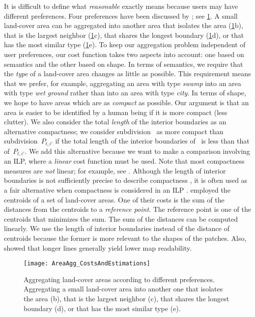 It is difficult to define what \emph{reasonable} exactly means 
because users may have different preferences.
Four preferences have been discussed by
\textcite{Cheng2006}; see \fig\ref{fig:AreaAgg_Preferences}.
A small land-cover area can be aggregated into another area 
that isolates the area 
(\fig\ref{fig:AreaAgg_Preferences}b), 
that is the largest neighbor 
(\fig\ref{fig:AreaAgg_Preferences}c), 
that shares the longest boundary 
(\fig\ref{fig:AreaAgg_Preferences}d), or 
that has the most similar type
(\fig\ref{fig:AreaAgg_Preferences}e).
To keep our aggregation problem independent of user preferences,
our cost function takes two aspects into account: 
one based on semantics and 
the other based on shape.
%
In terms of semantics, we require that 
the \emph{type} of a land-cover area changes 
as little as possible.
This requirement means that we prefer, for example, 
aggregating an area with type \emph{swamp} 
into an area with type \emph{wet ground} 
rather than into an area with type \emph{city}.
%
In terms of shape, we hope to have areas 
which are as \emph{compact} as possible.
Our argument is that an area is easier 
to be identified by a human being 
if it is more compact (less clutter).
%
We also consider the total \emph{length} 
of the interior boundaries as an alternative compactness;
we consider subdivision~\Pnode 
as more compact than subdivision~$P_{t,i'}$ 
if the total length of the interior boundaries of~\Pnode 
is less than that of~$P_{t,i'}$.
We add this alternative because we want to make a comparison 
involving an ILP, 
where a \emph{linear} cost function must be used.
Note that most compactness measures
are \emph{not} linear;
for example, see \textcite{Maceachren1985,Li2013Compactness}.
Although the length of interior boundaries 
is not sufficiently precise 
to describe compactness \parencite{Young1988},
it is often used as a fair alternative
when compactness is considered in an ILP
\parencite[e.g.,][]{Minas2016,Wright1983}.
\textcite{HaunertWolff2010AreaAgg} employed 
the centroids of a set of land-cover areas.
One of their costs is the sum of the distances 
from the centroids to a \emph{reference point}.
The reference point is one of the centroids
that minimizes the sum.
The sum of the distances can be computed linearly.
We use the length of interior boundaries 
instead of the distance of centroids because the former 
is more relevant to the shapes of the patches.
Also, \textcite{Harrie2015Readability} showed that
longer lines generally yield lower map readability.

\begin{figure}[tb]
\centering
\texttt{[image: AreaAgg\_CostsAndEstimations]}
\caption{Aggregating land-cover areas 
	according to different preferences.
	Aggregating a small land-cover area into another one 
	that isolates the area (b), 
	that is the largest neighbor (c), 
	that shares the longest boundary (d), or 
	that has the most similar type (e).}
\label{fig:AreaAgg_Preferences}	
\end{figure}


